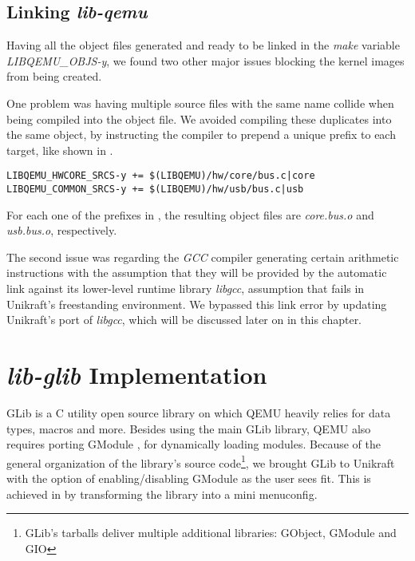\subsection{Linking \textit{lib-qemu}}
\label{subsec:linking-qemu}

Having all the object files generated and ready to be linked in the \textit{make} variable \textit{LIBQEMU_OBJS-y}, we found two other major issues blocking the kernel images from being created.

One problem was having multiple source files with the same name collide when being compiled into the object file.
We avoided compiling these duplicates into the same object, by instructing the compiler to prepend a unique prefix to each target, like shown in .

\lstset{language=make,caption=Object prefix for sources with identical names,label=lst:qemu-makefile-uk-5}
\begin{lstlisting}
LIBQEMU_HWCORE_SRCS-y += $(LIBQEMU)/hw/core/bus.c|core
LIBQEMU_COMMON_SRCS-y += $(LIBQEMU)/hw/usb/bus.c|usb
\end{lstlisting}

For each one of the prefixes in , the resulting object files are \textit{core.bus.o} and \textit{usb.bus.o}, respectively.

The second issue was regarding the \textit{GCC} compiler generating certain arithmetic instructions with the assumption that they will be provided by the automatic link against its lower-level runtime library \textit{libgcc}, assumption that fails in Unikraft's freestanding environment.
We bypassed this link error by updating Unikraft's port of \textit{libgcc}, which will be discussed later on in this chapter.

\section{\textit{lib-glib} Implementation}
\label{sec:lib-glib-impl}

GLib \cite{glib} is a C utility open source library on which QEMU heavily relies for data types, macros and more.
Besides using the main GLib library, QEMU also requires porting GModule \cite{gmodule}, for dynamically loading modules.
Because of the general organization of the library's source code\footnote{GLib's tarballs deliver multiple additional libraries: GObject, GModule and GIO}, we brought GLib to Unikraft with the option of enabling/disabling GModule as the user sees fit.
This is achieved in  by transforming the library into a mini menuconfig.

